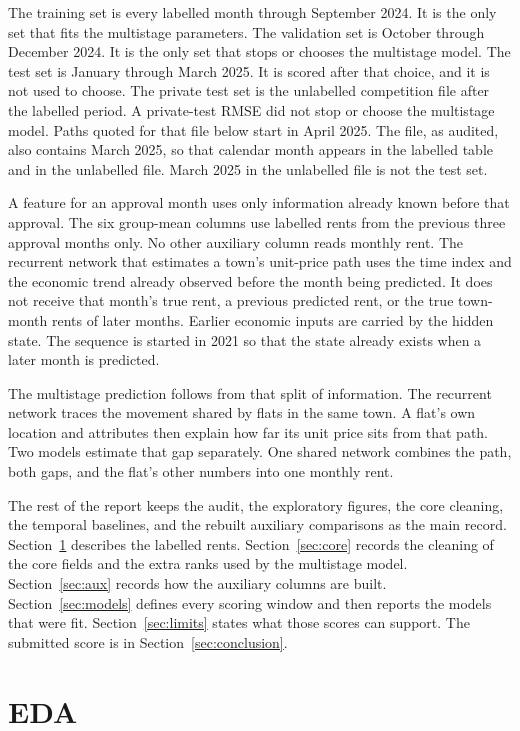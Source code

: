 \documentclass[11pt,a4paper]{article}
\begin{document}
The training set is every labelled month through September 2024.
It is the only set that fits the multistage parameters.
The validation set is October through December 2024.
It is the only set that stops or chooses the multistage model.
The test set is January through March 2025.
It is scored after that choice, and it is not used to choose.
The private test set is the unlabelled competition file after the labelled period.
A private-test RMSE did not stop or choose the multistage model.
Paths quoted for that file below start in April 2025.
The file, as audited, also contains March 2025, so that calendar month appears in the labelled table and in the unlabelled file.
March 2025 in the unlabelled file is not the test set.

A feature for an approval month uses only information already known before that approval.
The six group-mean columns use labelled rents from the previous three approval months only.
No other auxiliary column reads monthly rent.
The recurrent network that estimates a town's unit-price path uses the time index and the economic trend already observed before the month being predicted.
It does not receive that month's true rent, a previous predicted rent, or the true town-month rents of later months.
Earlier economic inputs are carried by the hidden state.
The sequence is started in 2021 so that the state already exists when a later month is predicted.

The multistage prediction follows from that split of information.
The recurrent network traces the movement shared by flats in the same town.
A flat's own location and attributes then explain how far its unit price sits from that path.
Two models estimate that gap separately.
One shared network combines the path, both gaps, and the flat's other numbers into one monthly rent.

The rest of the report keeps the audit, the exploratory figures, the core cleaning, the temporal baselines, and the rebuilt auxiliary comparisons as the main record.
Section~\ref{sec:eda} describes the labelled rents.
Section~\ref{sec:core} records the cleaning of the core fields and the extra ranks used by the multistage model.
Section~\ref{sec:aux} records how the auxiliary columns are built.
Section~\ref{sec:models} defines every scoring window and then reports the models that were fit.
Section~\ref{sec:limits} states what those scores can support.
The submitted score is in Section~\ref{sec:conclusion}.

\FloatBarrier
\section{EDA}
\label{sec:eda}
\end{document}
